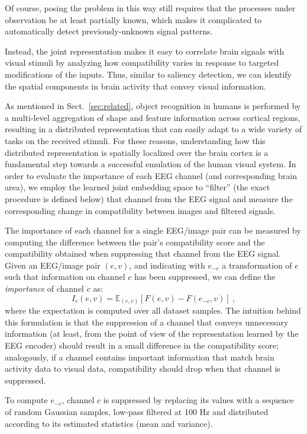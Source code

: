 \documentclass[10pt,journal,compsoc,twocolumn]{IEEEtran}
\begin{document}
Of course, posing the problem in this way still requires that the processes under observation be at least partially known, which makes it complicated to automatically detect previously-unknown signal patterns.

Instead, the joint representation makes it easy to correlate brain signals with visual stimuli by analyzing how compatibility varies in response to targeted modifications of the inputs. Thus, similar to saliency detection, we can identify the spatial components in brain activity that convey visual information. 

As mentioned in Sect.~\ref{sec:related}, object recognition in humans is performed by a multi-level aggregation of shape and feature information across cortical regions, resulting in a distributed representation that can easily adapt to a wide variety of tasks on the received stimuli. For these reasons, understanding how this distributed representation is spatially localized over the brain cortex is a fundamental step towards a successful emulation of the human visual system. In order to evaluate the importance of each EEG channel (and corresponding brain area), we employ the learned joint embedding space to ``filter'' (the exact procedure is defined below) that channel from the EEG signal and measure the corresponding change in compatibility between images and filtered signals.

The importance of each channel for a single EEG/image pair can be measured by computing the difference between the pair's compatibility score and the compatibility obtained when suppressing that channel from the EEG signal. Given an EEG/image pair $(e,v)$, and indicating with $e_{-c}$ a transformation of $e$ such that information on channel $c$ has been suppressed, we can define the \emph{importance} of channel $c$ as:
\begin{equation}
I_c(e,v) = \mathbb{E}_{(e,v)} \left[ F(e,v) - F(e_{-c}, v) \right]~,
\label{eq:chan_imp}
\end{equation}
where the expectation is computed over all dataset samples. The intuition behind this formulation is that the suppression of a channel that conveys unnecessary information (at least, from the point of view of the representation learned by the EEG encoder) should result in a small difference in the compatibility score; analogously, if a channel contains important information that match brain activity data to visual data, compatibility should drop when that channel is suppressed. 

To compute $e_{-c}$, channel $c$ is suppressed by replacing its values with a sequence of random Gaussian samples, low-pass filtered at 100 Hz and distributed according to its estimated statistics (mean and variance).
\end{document}
